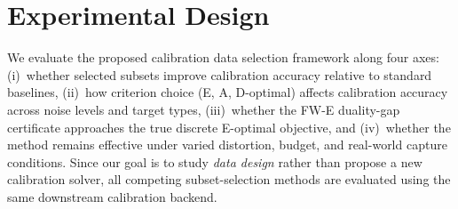 \documentclass[letterpaper, 9
 pt, conference]{ieeeconf}
\begin{document}
\section{Experimental Design}
\label{sec:experiments}

We evaluate the proposed calibration data selection framework along four axes:
(i)~whether selected subsets improve calibration accuracy relative to
standard baselines,
(ii)~how criterion choice (E, A, D-optimal) affects calibration accuracy
across noise levels and target types,
(iii)~whether the FW-E duality-gap certificate approaches the true discrete
E-optimal objective, and
(iv)~whether the method remains effective under varied distortion, budget,
and real-world capture conditions.
Since our goal is to study \emph{data design} rather than propose a new
calibration solver, all competing subset-selection methods are evaluated
using the same downstream calibration backend.
\end{document}
